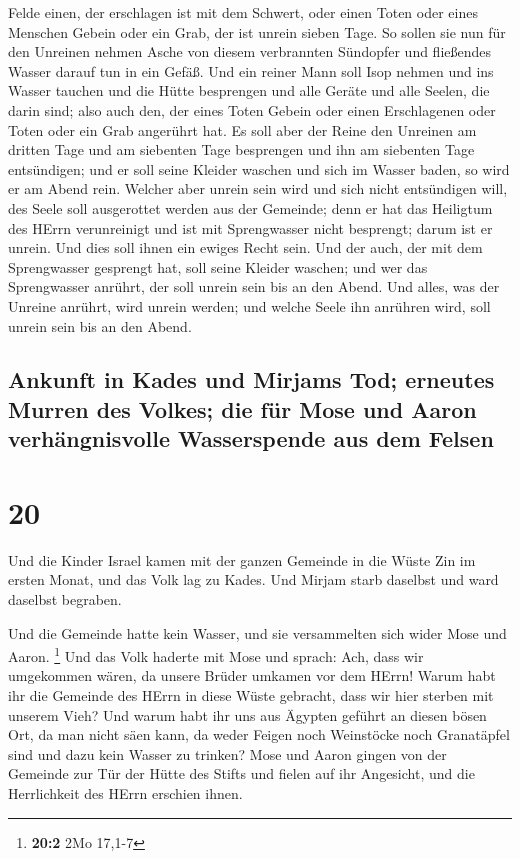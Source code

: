 Felde einen, der erschlagen ist mit dem Schwert, oder einen Toten oder
eines Menschen Gebein oder ein Grab, der ist unrein sieben Tage.
 So sollen sie nun für den Unreinen nehmen Asche von
diesem verbrannten Sündopfer und fließendes Wasser darauf tun in ein
Gefäß.  Und ein reiner Mann soll Isop nehmen und ins
Wasser tauchen und die Hütte besprengen und alle Geräte und alle Seelen,
die darin sind; also auch den, der eines Toten Gebein oder einen
Erschlagenen oder Toten oder ein Grab angerührt hat.  Es
soll aber der Reine den Unreinen am dritten Tage und am siebenten Tage
besprengen und ihn am siebenten Tage entsündigen; und er soll seine
Kleider waschen und sich im Wasser baden, so wird er am Abend rein.
 Welcher aber unrein sein wird und sich nicht entsündigen
will, des Seele soll ausgerottet werden aus der Gemeinde; denn er hat
das Heiligtum des HErrn verunreinigt und ist mit Sprengwasser nicht
besprengt; darum ist er unrein.  Und dies soll ihnen ein
ewiges Recht sein. Und der auch, der mit dem Sprengwasser gesprengt hat,
soll seine Kleider waschen; und wer das Sprengwasser anrührt, der soll
unrein sein bis an den Abend.  Und alles, was der Unreine
anrührt, wird unrein werden; und welche Seele ihn anrühren wird, soll
unrein sein bis an den Abend.

\hypertarget{ankunft-in-kades-und-mirjams-tod-erneutes-murren-des-volkes-die-fuxfcr-mose-und-aaron-verhuxe4ngnisvolle-wasserspende-aus-dem-felsen}{%
\subsection{Ankunft in Kades und Mirjams Tod; erneutes Murren des
Volkes; die für Mose und Aaron verhängnisvolle Wasserspende aus dem
Felsen}\label{ankunft-in-kades-und-mirjams-tod-erneutes-murren-des-volkes-die-fuxfcr-mose-und-aaron-verhuxe4ngnisvolle-wasserspende-aus-dem-felsen}}

\hypertarget{section-19}{%
\section{20}\label{section-19}}

 Und die Kinder Israel kamen mit der ganzen Gemeinde in
die Wüste Zin im ersten Monat, und das Volk lag zu Kades. Und Mirjam
starb daselbst und ward daselbst begraben.

 Und die Gemeinde hatte kein Wasser, und sie versammelten
sich wider Mose und Aaron. \footnote{\textbf{20:2} 2Mo 17,1-7}
 Und das Volk haderte mit Mose und sprach: Ach, dass wir
umgekommen wären, da unsere Brüder umkamen vor dem HErrn! 
Warum habt ihr die Gemeinde des HErrn in diese Wüste gebracht, dass wir
hier sterben mit unserem Vieh?  Und warum habt ihr uns aus
Ägypten geführt an diesen bösen Ort, da man nicht säen kann, da weder
Feigen noch Weinstöcke noch Granatäpfel sind und dazu kein Wasser zu
trinken?  Mose und Aaron gingen von der Gemeinde zur Tür
der Hütte des Stifts und fielen auf ihr Angesicht, und die Herrlichkeit
des HErrn erschien ihnen.

